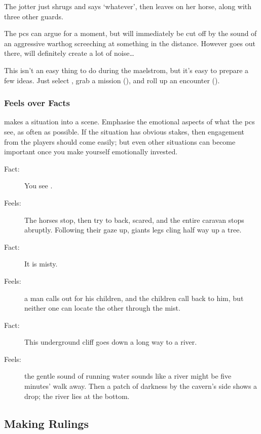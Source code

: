 \begin{multicols}{2}
\begin{boxtext}
  The \gls{jotter} just shrugs and says `whatever', then leaves on her horse, along with three other \glspl{guard}.
\end{boxtext}

The \glspl{pc} can argue for a moment, but will immediately be cut off by the sound of an aggressive warthog screeching at something in the distance.
However goes out there, will definitely create a lot of noise\ldots

\bigLine
\vspace{\baselineskip}

\noindent
This isn't an easy thing to do during the maelstrom, but it's easy to prepare a few ideas.
Just select , grab a mission (), and roll up an encounter ().

\subsubsection{Feels over Facts}
makes a situation into a scene.
Emphasise the emotional aspects of what the \glspl{pc} see, as often as possible.
If the situation has obvious stakes, then engagement from the players should come easily; but even other situations can become important once you make yourself emotionally invested.

\begin{description}
  \item[Fact:] You see .
  \item[\quad Feels:] The horses stop, then try to back, scared, and the entire caravan stops abruptly.
  Following their gaze up, giants legs cling half way up a tree.
  \item[Fact:] It is misty.
  \item[\quad Feels:] a man calls out for his children, and the children call back to him, but neither one can locate the other through the mist.
  \item[Fact:] This underground cliff goes down a long way to a river.
  \item[\quad Feels:] the gentle sound of running water sounds like a river might be five minutes' walk away.
  Then a patch of darkness by the cavern's side shows a drop; the river lies at the bottom.
\end{description}

\subsection{Making Rulings}


\end{multicols}
